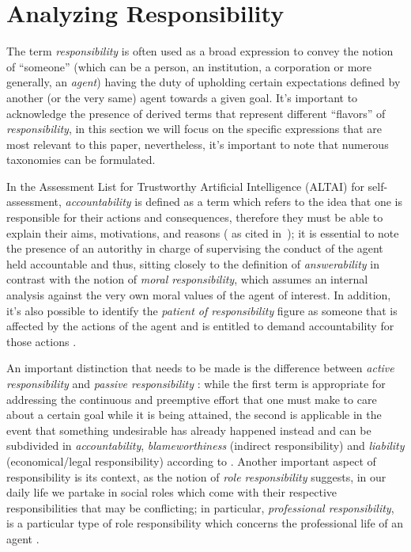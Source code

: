 \section{Analyzing Responsibility}\label{sec:responsibility}

The term \textit{responsibility} is often used as a broad expression to convey the notion of ``someone'' (which can be a person, an institution, a corporation or more generally, an \textit{agent}) having the duty of upholding certain expectations defined by another (or the very same) agent towards a given goal.
It's important to acknowledge the presence of derived terms that represent different ``flavors'' of \textit{responsibility}, in this section we will focus on the specific expressions that are most relevant to this paper, nevertheless, it's important to note that numerous taxonomies can be formulated.

In the Assessment List for Trustworthy Artificial Intelligence (ALTAI) for self-assessment, \textit{accountability} is defined as a term which refers to the idea that one is responsible for their actions and consequences, therefore they must be able to explain their aims, motivations, and reasons (\cite{ALTAI} as cited in~\cite{NOVAIA}); it is essential to note the presence of an autorithy in charge of supervising the conduct of the agent held accountable and thus, sitting closely to the definition of \textit{answerability} \parencite{NISAIA} in contrast with the notion of \textit{moral responsibility}, which assumes an internal analysis against the very own moral values of the agent of interest.
In addition, it's also possible to identify the \textit{patient of responsibility} figure as someone that is affected by the actions of the agent and is entitled to demand accountability for those actions \parencite{COEAIR}.

An important distinction that needs to be made is the difference between \textit{active responsibility} and \textit{passive responsibility} \parencite{ETE}: while the first term is appropriate for addressing the continuous and preemptive effort that one must make to care about a certain goal while it is being attained, the second is applicable in the event that something undesirable has already happened instead and can be subdivided in \textit{accountability}, \textit{blameworthiness} (indirect responsibility) and \textit{liability} (economical/legal responsibility) according to \parencite{ETE}.
Another important aspect of responsibility is its context, as the notion of \textit{role responsibility} suggests, in our daily life we partake in social roles which come with their respective responsibilities that may be conflicting; in particular, \textit{professional responsibility}, is a particular type of role responsibility which concerns the professional life of an agent \parencite{ETE}.

